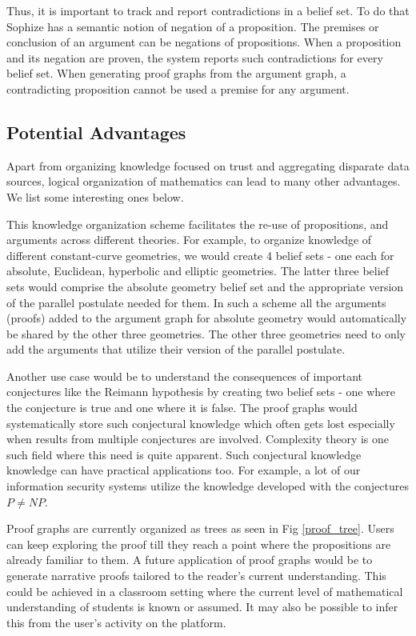 \documentclass[runningheads]{llncs}
\begin{document}
Thus, it is important to track and report contradictions in a belief set. To do that Sophize has a semantic notion of negation of a proposition. The premises or conclusion of an argument can be negations of propositions. When a proposition and its negation are proven, the system reports such contradictions for every belief set. When generating proof graphs from the argument graph, a contradicting proposition cannot be used a premise for any argument.

\subsection{Potential Advantages}

Apart from organizing knowledge focused on trust and aggregating disparate data sources, logical organization of mathematics can lead to many other advantages. We list some interesting ones below.

This knowledge organization scheme facilitates the re-use of propositions, and arguments across different theories. For example, to organize knowledge of different constant-curve geometries, we would create 4 belief sets - one each for absolute, Euclidean, hyperbolic and elliptic geometries. The latter three belief sets would comprise the absolute geometry belief set and the appropriate version of the parallel postulate needed for them. In such a scheme all the arguments (proofs) added to the argument graph for absolute geometry would automatically be shared by the other three geometries. The other three geometries need to only add the arguments that utilize their version of the parallel postulate.

Another use case would be to understand the consequences of important conjectures like the Reimann hypothesis by creating two belief sets - one where the conjecture is true and one where it is false. The proof graphs would systematically store such conjectural knowledge which often gets lost especially when results from multiple conjectures are involved. Complexity theory is one such field where this need is quite apparent. Such conjectural knowledge knowledge can have practical applications too. For example, a lot of our information security systems utilize the knowledge developed with the conjectures $P \neq NP$.

Proof graphs are currently organized as trees as seen in Fig \ref{proof_tree}. Users can keep exploring the proof till they reach a point where the propositions are already familiar to them. A future application of proof graphs would be to generate narrative proofs tailored to the reader's current understanding. This could be achieved in a classroom setting where the current level of mathematical understanding of students is known or assumed. It may also be possible to infer this from the user's activity on the platform.
\end{document}

